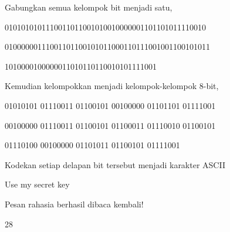 \documentclass{article}
\begin{document}

Gabungkan semua kelompok bit menjadi satu,

0101010101110011011001010010000001101101011110010

01000000111001101100101011000110111001001100101011

1010000100000011010110110010101111001

Kemudian kelompokkan menjadi kelompok-kelompok 8-bit,

01010101 01110011 01100101 00100000 01101101 01111001

00100000 01110011 01100101 01100011 01110010 01100101

01110100 00100000 01101011 01100101 01111001

Kodekan setiap delapan bit tersebut menjadi karakter ASCII

Use my secret key

Pesan rahasia berhasil dibaca kembali!

28
\end{document}

